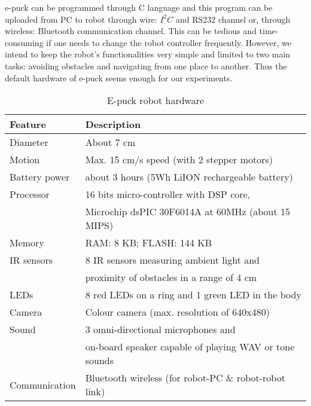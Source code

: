 e-puck can be programmed through C language and this program can be uploaded from PC to robot through wire: $I^{2}C$ and RS232 channel or, through  wireless: Bluetooth communication channel. This can be tedious and time-consuming if one needs to change the robot controller frequently. However, we intend to keep the robot's functionalities very simple and limited to two main tasks: avoiding obstacles and navigating from one place to another. Thus the default hardware of e-puck seems enough for our experiments.
\begin{table}
\caption{E-puck robot hardware}
\label{table:epuck}
\begin{center}
\begin{tabular}{|l|l|}
\hline \textbf{Feature} & \textbf{Description}\\
\hline Diameter & About 7 cm\\
\hline Motion & Max. 15 cm/s speed (with 2 stepper motors)\\
\hline Battery power & about 3 hours (5Wh LiION rechargeable battery)\\
\hline Processor & 16 bits micro-controller with DSP core,\\ & Microchip dsPIC 30F6014A at 60MHz (about 15 MIPS)\\
\hline Memory & RAM: 8 KB; FLASH: 144 KB \\
\hline IR sensors & 8 IR sensors measuring ambient light and \\ & proximity of obstacles in a range of 4 cm\\
\hline LEDs & 8 red LEDs on a ring and 1 green LED in the body \\
\hline Camera & Colour camera (max. resolution of 640x480) \\
\hline Sound & 3 omni-directional microphones and\\ & on-board speaker capable of playing WAV or tone sounds\\
\hline Communication & Bluetooth wireless (for robot-PC \& robot-robot link)\\
\hline
\end{tabular}
\end{center}
\end{table}
